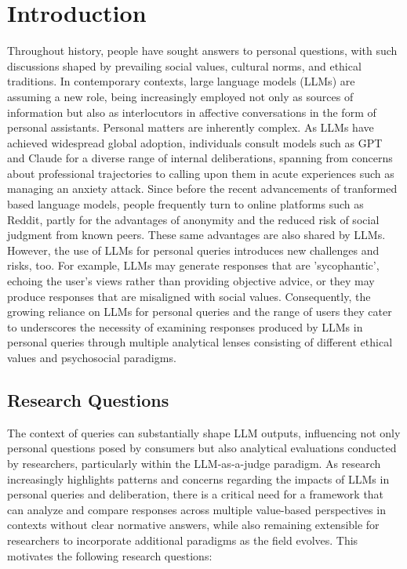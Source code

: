 \section{Introduction}
\textcolor{black!80}{Throughout history, people have sought answers to personal questions, with such discussions shaped by prevailing social values, cultural norms, and ethical traditions. In contemporary contexts, large language models (LLMs) are assuming a new role, being increasingly employed not only as sources of information but also as interlocutors in affective conversations in the form of personal assistants.
Personal matters are inherently complex. As LLMs have achieved widespread global adoption, individuals consult models such as GPT and Claude for a diverse range of internal deliberations, spanning from concerns about professional trajectories to calling upon them in acute experiences such as managing an anxiety attack. Since before the recent advancements of tranformed based language models, people frequently turn to online platforms such as Reddit, partly for the advantages of anonymity and the reduced risk of social judgment from known peers. These same advantages are also shared by LLMs. However, the use of LLMs for personal queries introduces new challenges and risks, too. For example, LLMs may generate responses that are 'sycophantic', echoing the user's views rather than providing objective advice, or they may produce responses that are misaligned with social values.
Consequently, the growing reliance on LLMs for personal queries and the range of users they cater to underscores the necessity of examining responses produced by LLMs in personal queries through multiple analytical lenses consisting of different ethical values and psychosocial paradigms.}

\textcolor{black!30}{\lipsum[1-2]}


\subsection{Research Questions}\label{sec:RQs}
The context of queries can substantially shape LLM outputs, influencing not only personal questions posed by consumers but also analytical evaluations conducted by researchers, particularly within the LLM-as-a-judge paradigm. As research increasingly highlights patterns and concerns regarding the impacts of LLMs in personal queries and deliberation, there is a critical need for a framework that can analyze and compare responses across multiple value-based perspectives in contexts without clear normative answers, while also remaining extensible for researchers to incorporate additional paradigms as the field evolves. This motivates the following research questions: 

